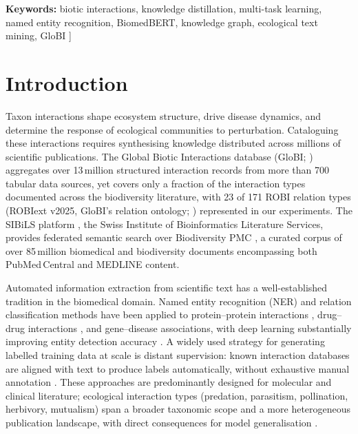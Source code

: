 \documentclass[11pt,twocolumn]{article}
\begin{document}
{\textbf{Keywords:} biotic interactions, knowledge distillation, multi-task
learning, named entity recognition, BiomedBERT, knowledge graph,
ecological text mining, GloBI
\vspace{1em}
}]%

\section{Introduction}
\label{sec:intro}

Taxon interactions shape ecosystem structure, drive disease dynamics,
and determine the response of ecological communities to perturbation.
Cataloguing these interactions requires synthesising knowledge distributed
across millions of scientific publications.
The Global Biotic Interactions database (GloBI; \citealt{poelen2014global})
aggregates over 13\,million structured interaction records from more than 700 tabular
data sources, yet covers only a fraction of the interaction types documented
across the biodiversity literature, with 23 of 171 ROBI relation types
(ROBIext v2025, GloBI's relation ontology; \citealt{poelen2014global})
represented in our experiments.
The SIBiLS platform \citep{mottin2021sibils}, the Swiss Institute of
Bioinformatics Literature Services, provides federated semantic search over
Biodiversity PMC \citep{biodiversitypmc2024}, a curated corpus of over
85\,million biomedical and biodiversity documents encompassing both
PubMed\,Central and MEDLINE content.

Automated information extraction from scientific text has a well-established
tradition in the biomedical domain.
Named entity recognition (NER) and relation classification methods have been
applied to protein--protein interactions \citep{bunescu2005comparative},
drug--drug interactions \citep{lim2018drug}, and gene--disease associations,
with deep learning substantially improving entity detection accuracy
\citep{habibi2017deep}.
A widely used strategy for generating labelled training data at scale is
distant supervision: known interaction databases are aligned with text to
produce labels automatically, without exhaustive manual annotation
\citep{mintz2009distant}.
These approaches are predominantly designed for molecular and clinical
literature; ecological interaction types (predation, parasitism, pollination,
herbivory, mutualism) span a broader taxonomic scope and a more heterogeneous
publication landscape, with direct consequences for model generalisation
\citep{thessen2012nlp}.
\end{document}
